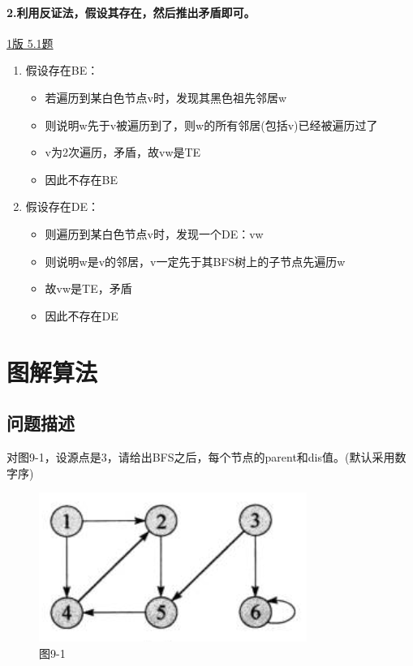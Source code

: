 \documentclass{article}
\begin{document}
\paragraph{2.利用反证法，假设其存在，然后推出矛盾即可。}

\href{https://github.com/Shannju/njucser_helphelp/blob/main/Algorithm%E7%AE%97%E6%B3%95/%E7%AD%94%E6%A1%88/%E7%AE%97%E6%B3%95%E7%AD%94%E6%A1%88csdn%EF%BC%88%E5%8A%A9%E6%95%99%E5%B7%B2%E5%88%A0%E9%99%A4.pdf}{1版 5.1题}

\begin{enumerate}
    \item 假设存在BE：
    \begin{itemize}
        \item 若遍历到某白色节点v时，发现其黑色祖先邻居w
        \item 则说明w先于v被遍历到了，则w的所有邻居(包括v)已经被遍历过了
        \item v为2次遍历，矛盾，故vw是TE
        \item 因此不存在BE
    \end{itemize}
    
    \item 假设存在DE：
    \begin{itemize}
        \item 则遍历到某白色节点v时，发现一个DE：vw
        \item 则说明w是v的邻居，v一定先于其BFS树上的子节点先遍历w
        \item 故vw是TE，矛盾
        \item 因此不存在DE
    \end{itemize}
\end{enumerate}

\pagebreak
\section{图解算法}

\subsection{问题描述}

对图9-1，设源点是3，请给出BFS之后，每个节点的parent和dis值。(默认采用数字序)

\begin{figure}[h]
    \centering
    \includegraphics[width=0.5\linewidth]{Figure/9-1.png}
    \caption{图9-1}
    \label{fig:9-1 raw}
\end{figure}
\end{document}
